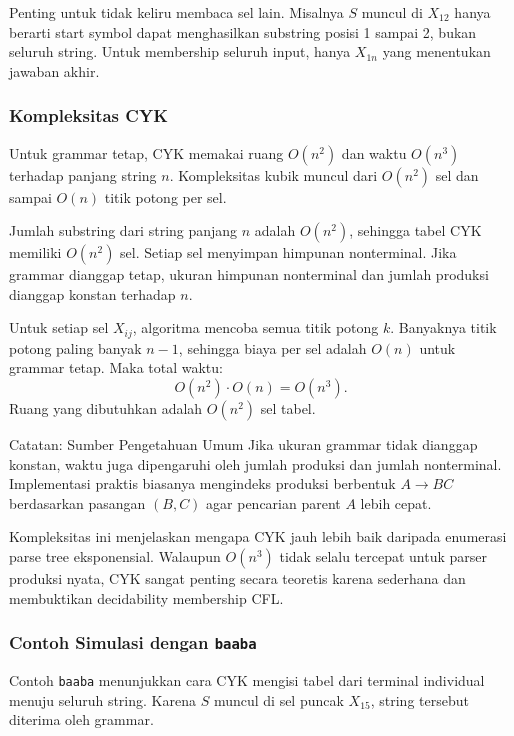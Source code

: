 Penting untuk tidak keliru membaca sel lain. Misalnya $S$ muncul di $X_{12}$ hanya berarti start symbol dapat menghasilkan substring posisi 1 sampai 2, bukan seluruh string. Untuk membership seluruh input, hanya $X_{1n}$ yang menentukan jawaban akhir.

\subsubsection{Kompleksitas CYK}

\begin{jawab}
Untuk grammar tetap, CYK memakai ruang $O(n^2)$ dan waktu $O(n^3)$ terhadap panjang string $n$. Kompleksitas kubik muncul dari $O(n^2)$ sel dan sampai $O(n)$ titik potong per sel.
\end{jawab}

Jumlah substring dari string panjang $n$ adalah $O(n^2)$, sehingga tabel CYK memiliki $O(n^2)$ sel. Setiap sel menyimpan himpunan nonterminal. Jika grammar dianggap tetap, ukuran himpunan nonterminal dan jumlah produksi dianggap konstan terhadap $n$.

Untuk setiap sel $X_{ij}$, algoritma mencoba semua titik potong $k$. Banyaknya titik potong paling banyak $n-1$, sehingga biaya per sel adalah $O(n)$ untuk grammar tetap. Maka total waktu:
\[
    O(n^2)\cdot O(n)=O(n^3).
\]
Ruang yang dibutuhkan adalah $O(n^2)$ sel tabel.

\begin{cmt}{Catatan: Sumber Pengetahuan Umum}{}
Jika ukuran grammar tidak dianggap konstan, waktu juga dipengaruhi oleh jumlah produksi dan jumlah nonterminal. Implementasi praktis biasanya mengindeks produksi berbentuk $A\rightarrow BC$ berdasarkan pasangan $(B,C)$ agar pencarian parent $A$ lebih cepat.
\end{cmt}

Kompleksitas ini menjelaskan mengapa CYK jauh lebih baik daripada enumerasi parse tree eksponensial. Walaupun $O(n^3)$ tidak selalu tercepat untuk parser produksi nyata, CYK sangat penting secara teoretis karena sederhana dan membuktikan decidability membership CFL.

\subsubsection{Contoh Simulasi dengan \texttt{baaba}}

\begin{jawab}
Contoh \texttt{baaba} menunjukkan cara CYK mengisi tabel dari terminal individual menuju seluruh string. Karena $S$ muncul di sel puncak $X_{15}$, string tersebut diterima oleh grammar.
\end{jawab}

